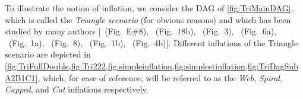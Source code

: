 \documentclass[aps,english,superscriptaddress,onecolumn,twoside,longbibliography,pra,floatfix,fleqn,nofootinbib]{revtex4-1}%
\theoremstyle{definition}
\begin{document}
To illustrate the notion of inflation, we consider the DAG of \cref{fig:TriMainDAG}, which is called the {\em Triangle scenario} (for obvious reasons) and which has been studied by many authors [\citealp{pusey2014gdag}~(Fig.~E\#8), \citealp{WoodSpekkens}~(Fig.~18b), \citealp{fritz2012bell}~(Fig.~3), \citealp{chaves2014novel}~(Fig.~6a), \citealp{Chaves2015infoquantum}~(Fig.~1a), \citealp{BilocalCorrelations}~(Fig.~8), \citealp{steudel2010ancestors}~(Fig.~1b), \citealp{chaves2014informationinference}~(Fig.~4b)].
Different inflations of the Triangle scenario are depicted in \cref{fig:TriFullDouble,fig:Tri222,fig:simpleinflation,fig:simplestinflation,fig:TriDagSubA2B1C1}, which, for ease of reference, will be referred to as the {\em Web}, {\em Spiral}, {\em Capped}, and {\em Cut} inflations respectively.
\end{document}

